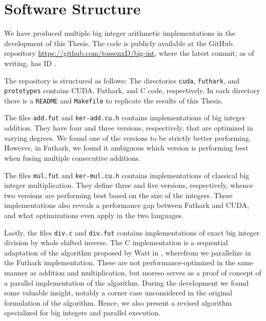 \section{Software Structure}
\label{sec:cont}

We have produced multiple big integer arithmetic implementations in the
development of this Thesis. The code is publicly available at the GitHub
repository \url{https://github.com/tossenxD/big-int}, where the latest commit,
as of writing, has ID {}.

The repository is structured as follows: The directories \texttt{cuda},
\texttt{futhark}, and \texttt{prototypes} contains CUDA, Futhark, and C code,
respectively. In each directory there is a \texttt{README} and \texttt{Makefile}
to replicate the results of this Thesis.

The files \texttt{add.fut} and \texttt{ker-add.cu.h} contains implementations of
big integer addition. They have four and three versions, respectively, that are
optimized in varying degrees. We found one of the versions to be strictly better
performing. However, in Futhark, we found it ambiguous which version is
performing best when fusing multiple consecutive additions.

The files \texttt{mul.fut} and \texttt{ker-mul.cu.h} contains implementations of
classical big integer multiplication. They define three and five versions,
respectively, whence two versions are performing best based on the size of the
integers. These implementations also reveals a performance gap between Futhark
and CUDA, and what optimizations even apply in the two languages.

Lastly, the files \texttt{div.c} and \texttt{div.fut} contains implementations
of exact big integer division by whole shifted inverse. The C implementation is
a sequential adaptation of the algorithm proposed by Watt in
\cite{watt2023efficient}, wherefrom we parallelize in the Futhark
implementation. These are not performance-optimized in the same manner as
addition and multiplication, but moreso serves as a proof of concept of a
parallel implementation of the algorithm. During the development we found some
valuable insight, notably a corner case unconsidered in the original formulation
of the algorithm. Hence, we also present a revised algorithm specialized for big
integers and parallel execution.

{}

